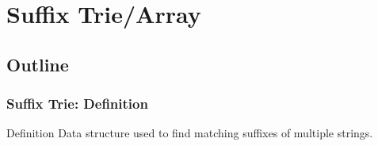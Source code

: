 \documentclass{beamer}
\begin{document}
\section{Suffix Trie/Array} %
\subsection{Outline}
\begin{frame}
  \frametitle{Suffix Trie: Definition}

  {\smaller
    \begin{block}{Definition}
      Data structure used to find matching suffixes of multiple strings.
    \end{block}

    \vfill

    \begin{center}
    \end{center}

    \vfill

}
\end{frame}
\end{document}
